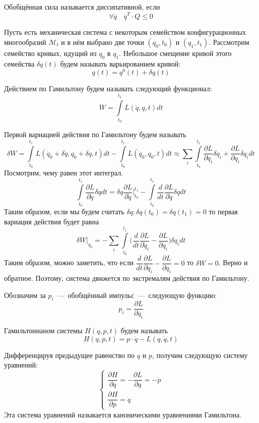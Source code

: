 \begin{definition}
Обобщённая сила называется диссипативной, если \[\forall \dot{q} \quad \dot{q}^T \cdot Q \leq 0\]
\end{definition}
\begin{definition}
    Пусть есть механическая система с некоторым семейством конфигурационных многообразий $\mathcal{M}_t$ и в нём выбрано две точки $(q_0, t_0)$ и $(q_1, t_1)$. Рассмотрим семейство кривых, идущий из $q_0$ в $q_1$. Небольшое смещение кривой этого семейства $\delta q(t)$ будем называть варьированием кривой: \[q(t) = q^0(t) + \delta q(t)\]
\end{definition}
\begin{definition}
    Действием по Гамильтону будем называть следующий функционал: \[W = \int\limits_{t_0}^{t_1} L(\dot{q}, q, t)dt\]
\end{definition}
\begin{definition}
    Первой вариацией действия по Гамильтону будем называть \[\delta W = \int\limits_{t_0}^{t_1}L(\dot{q}_0 + \delta \dot{q}, q_0 + \delta q, t)dt - \int\limits_{t_0}^{t_1}L(\dot{q}_0, q_0, t)dt \approx \sum\limits_i\int\limits_{t_0}^{t_1}\dfrac{\partial L}{\partial \dot{q}_i}\delta \dot{q}_i + \dfrac{\partial L}{\partial q_i}\delta q_i dt\]
    Посмотрим, чему равен этот интеграл. \[\int\limits_{t_0}^{t_1} \dfrac{\partial L}{\partial \dot{q}}\delta \dot{q}dt = \delta q \dfrac{\partial L}{\partial \dot{q}}\biggr|_{t_0}^{t_1} - \int\limits_{t_0}^{t_1} \dfrac{d}{dt}\dfrac{\partial L}{\partial \dot{q}} \delta q dt \]
    Таким образом, если мы будем считать $\delta q: \delta q(t_0) = \delta q(t_1) = 0$ то первая вариация действия будет равна \[\delta W\biggr|_{q_0} = -\sum\limits_i \int\limits_{t_0}^{t_1} \biggr(\dfrac{d}{dt}\dfrac{\partial L}{\partial \dot{q}_i} - \dfrac{\partial L}{\partial q_i}\biggr)\delta q_i dt\]
    Таким образом, можно заметить, что если $\dfrac{d}{dt}\dfrac{\partial L}{\partial \dot{q}_i} - \dfrac{\partial L}{\partial q_i} = 0$ то $\delta W = 0$.
    Верно и обратное. Поэтому, система движется по экстремалям действия по Гамильтону.
\end{definition}
\begin{definition}
    Обозначим за $p_i$~---~обобщённый импульс~---~следующую функцию: \[p_i = \dfrac{\partial L}{\partial \dot{q}_i}\]
\end{definition}
\begin{definition}
    Гамильтонианом системы $H(q, p, t)$ будем называть \[H(q, p, t) = p \cdot \dot{q} - L(q, \dot{q}, t)\]
\end{definition}
\begin{definition}
    Дифференцируя предыдущее равенство по $q$ и $p$, получим следующую систему уравнений: 
    \begin{equation*}
        \begin{cases}
            \dfrac{\partial H}{\partial q} = - \dfrac{\partial L}{\partial q} = -\dot{p} \\
            \dfrac{\partial H}{\partial p} = \dot{q}
        \end{cases}
    \end{equation*}
    Эта система уравнений называется каноническими уравнениями Гамильтона.
\end{definition}